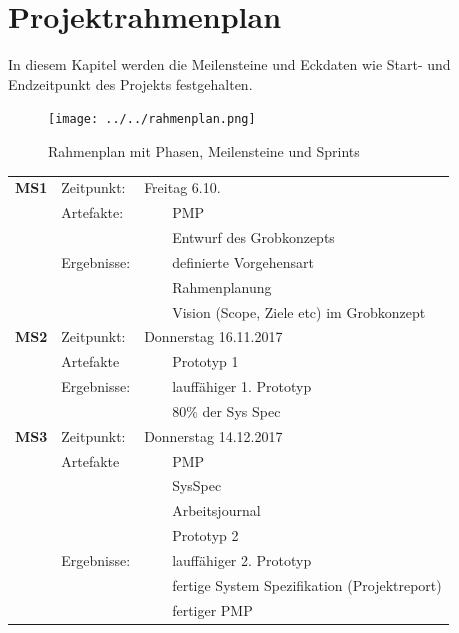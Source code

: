 \documentclass[a4paper, 10pt, fleqn]{article}
\newcommand{\tabitem}{~~\llap{\textbullet}~~}
\begin{document}
	\section{Projektrahmenplan}
        In diesem Kapitel werden die Meilensteine und Eckdaten wie Start- und Endzeitpunkt des Projekts festgehalten.
        \begin{figure}[H]
            \centering
            \texttt{[image: ../../rahmenplan.png]}
            \caption{Rahmenplan mit Phasen, Meilensteine und Sprints}
        \end{figure}
        \begin{tabularx}{\textwidth}{lll}
            \textbf{MS1} & Zeitpunkt: & Freitag 6.10.\\
            & Artefakte: & \tabitem PMP\\
            & & \tabitem Entwurf des Grobkonzepts\\
            & Ergebnisse: & \tabitem definierte Vorgehensart\\
            & & \tabitem Rahmenplanung\\
            & & \tabitem Vision (Scope, Ziele etc) im Grobkonzept\\
            \textbf{MS2} & Zeitpunkt: & Donnerstag 16.11.2017\\
            & Artefakte & \tabitem Prototyp 1\\
            & Ergebnisse: & \tabitem lauffähiger 1. Prototyp\\
            & & \tabitem 80\% der Sys Spec\\
            \textbf{MS3} & Zeitpunkt: & Donnerstag 14.12.2017\\
            & Artefakte & \tabitem PMP \\
            & & \tabitem SysSpec \\
            & & \tabitem Arbeitsjournal \\
            & & \tabitem Prototyp 2\\
            & Ergebnisse: & \tabitem lauffähiger 2. Prototyp\\
            & & \tabitem fertige System Spezifikation (Projektreport)\\
            & & \tabitem fertiger PMP\\
        \end{tabularx}
    \clearpage
\end{document}
